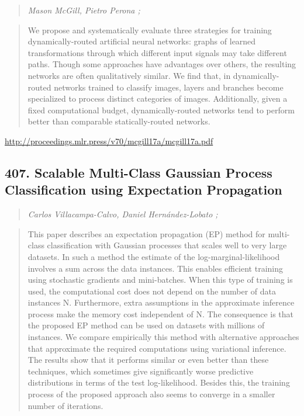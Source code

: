 \documentclass{article}
\begin{document}
\begin{quote}
\footnotesize{\textit{Mason McGill, Pietro Perona ;}}
\end{quote}

\begin{quote}
    We propose and systematically evaluate three strategies for training dynamically-routed artificial neural networks: graphs of learned transformations through which different input signals may take different paths. Though some approaches have advantages over others, the resulting networks are often qualitatively similar. We find that, in dynamically-routed networks trained to classify images, layers and branches become specialized to process distinct categories of images. Additionally, given a fixed computational budget, dynamically-routed networks tend to perform better than comparable statically-routed networks.  \end{quote}

\href{http://proceedings.mlr.press/v70/mcgill17a/mcgill17a.pdf}{http://proceedings.mlr.press/v70/mcgill17a/mcgill17a.pdf}

\subsection{407. Scalable Multi-Class Gaussian Process Classification using Expectation Propagation}

\begin{quote}
\footnotesize{\textit{Carlos Villacampa-Calvo, Daniel Hernández-Lobato ;}}
\end{quote}

\begin{quote}
    This paper describes an expectation propagation (EP) method for multi-class classification with Gaussian processes that scales well to very large datasets. In such a method the estimate of the log-marginal-likelihood involves a sum across the data instances. This enables efficient training using stochastic gradients and mini-batches. When this type of training is used, the computational cost does not depend on the number of data instances N. Furthermore, extra assumptions in the approximate inference process make the memory cost independent of N. The consequence is that the proposed EP method can be used on datasets with millions of instances. We compare empirically this method with alternative approaches that approximate the required computations using variational inference. The results show that it performs similar or even better than these techniques, which sometimes give significantly worse predictive distributions in terms of the test log-likelihood. Besides this, the training process of the proposed approach also seems to converge in a smaller number of iterations.  \end{quote}
\end{document}
